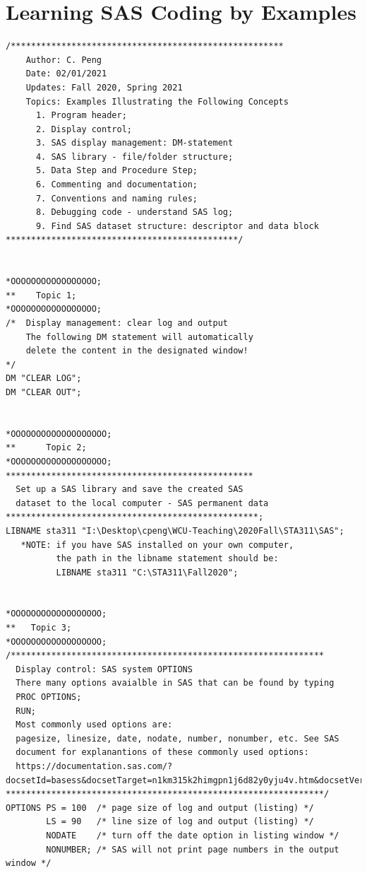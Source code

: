 \documentclass[
]{book}
\begin{document}
\hypertarget{learning-sas-coding-by-examples}{%
\section{Learning SAS Coding by Examples}\label{learning-sas-coding-by-examples}}

\begin{verbatim}
/******************************************************
    Author: C. Peng
    Date: 02/01/2021
    Updates: Fall 2020, Spring 2021
    Topics: Examples Illustrating the Following Concepts
      1. Program header;
      2. Display control;
      3. SAS display management: DM-statement
      4. SAS library - file/folder structure;
      5. Data Step and Procedure Step;
      6. Commenting and documentation;
      7. Conventions and naming rules;
      8. Debugging code - understand SAS log;
      9. Find SAS dataset structure: descriptor and data block
**********************************************/


*OOOOOOOOOOOOOOOOO;
**    Topic 1;
*OOOOOOOOOOOOOOOOO;
/*  Display management: clear log and output 
    The following DM statement will automatically
    delete the content in the designated window!
*/
DM "CLEAR LOG";
DM "CLEAR OUT";


*OOOOOOOOOOOOOOOOOOO;
**      Topic 2;
*OOOOOOOOOOOOOOOOOOO;
************************************************* 
  Set up a SAS library and save the created SAS
  dataset to the local computer - SAS permanent data
**************************************************;
LIBNAME sta311 "I:\Desktop\cpeng\WCU-Teaching\2020Fall\STA311\SAS";
   *NOTE: if you have SAS installed on your own computer,
          the path in the libname statement should be:
          LIBNAME sta311 "C:\STA311\Fall2020";


*OOOOOOOOOOOOOOOOOO;
**   Topic 3;
*OOOOOOOOOOOOOOOOOO;
/**************************************************************
  Display control: SAS system OPTIONS
  There many options avaialble in SAS that can be found by typing
  PROC OPTIONS; 
  RUN;
  Most commonly used options are:
  pagesize, linesize, date, nodate, number, nonumber, etc. See SAS
  document for explanantions of these commonly used options:
  https://documentation.sas.com/?docsetId=basess&docsetTarget=n1km315k2himgpn1j6d82y0yju4v.htm&docsetVersion=9.4&locale=en
***************************************************************/
OPTIONS PS = 100  /* page size of log and output (listing) */
        LS = 90   /* line size of log and output (listing) */   
        NODATE    /* turn off the date option in listing window */
        NONUMBER; /* SAS will not print page numbers in the output window */



\end{verbatim}
\end{document}
